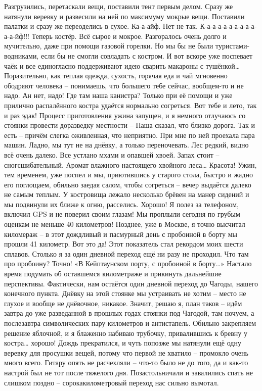 Разгрузились, перетаскали вещи, поставили тент первым делом. Сразу же натянули веревку и развесили на ней по максимуму мокрые вещи. Поставили палатки и сразу же переоделись в сухое. Ка-а-айф. Нет не так. К-а-а-а-а-а-а-а-а-а-а-а-йф!!! Теперь костёр. Всё сырое и мокрое. Разгоралось очень долго и мучительно, даже при помощи газовой горелки. Но мы бы не были туристами-водниками, если бы не смогли совладать с костром. И вот вскоре уже поспевает чаёк и все единогласно поддерживают идею сварить макароны с тушёнкой…
Поразительно, как теплая одежда, сухость, горячая еда и чай мгновенно ободряют человека – понимаешь, что большего тебе сейчас, вообщем-то и не надо. Ан нет, надо! Где там наша канистра? Только при её помощи и уже прилично распалённого костра удаётся нормально согреться. Вот тебе и лето, так и раз эдак!  
Процесс приготовления ужина запущен, и я немного отлучаюсь со стоянки провести доразведку местности – Паша сказал, что близко дорога. Так и есть – причём слегка оживленная, что неприятно. При мне по ней проехала пара машин. Ладно, мы тут не на днёвку, а только переночевать. Лес редкий, видно всё очень далеко. Все устлано мхами и опавшей хвоей. Запах стоит – сногсшибательный. Аромат влажного настоящего хвойного леса… Красота!
Ужин, тем временем, уже поспел и мы, приютившись у старого стола, быстро и жадно его поглощаем, обильно заедая салом, чтобы согреться – вечер выдаётся далеко не самым теплым. У костровища лежало несколько брёвен на манер сидений и мы подвинули их ближе к огню, расселись. Хорошо! Я полез за телефоном, включил GPS и не поверил своим глазам! Мы проплыли сегодня по грубым оценкам не меньше 40 километров! Позднее, уже в Москве, я точно высчитал киломераж – в этот дождливый и пасмурный день с пробоиной в борту мы прошли 41 километр. Вот это да! Этот показатель стал рекордом моих шести сплавов. Столько я за один дневной переход ещё ни разу не проходил. Что там про пробоину? Точно! «В Кейптаунском порту, с пробоиной в борту…»
Настало время подумать об оставшемся километраже и прикинуть дальнейшие перспективы. Фактически, нам остаётся один дневной переход до Чагоды, нашего конечного пункта. Днёвку на этой стоянке мы устраивать не хотим – место не глухое и вообще не днёвочное, никакое. Значит, решаю я, план таков – идём завтра до уже разведанной в прошлых годах стоянки под Чагодой, там ночуем, а послезавтра символических пару километров и антистапель. Обильно закрепляем решение яблочной, и я блаженно набиваю трубочку, привалившись к бревну у костра… хорошо! 
Дождь прекратился, и чуть попозже мы натянули ещё одну веревку для просушки вещей, потому что первой не хватило – промокло очень много всего. Гитару опять не расчехляли – что-то было не до того, да и как-то настрой был не тот после тяжелого дня. Позастольничали и завалились спать не слишком поздно – сорокакилометровый переход нас сильно вымотал.

\begin{center}
\end{center}
